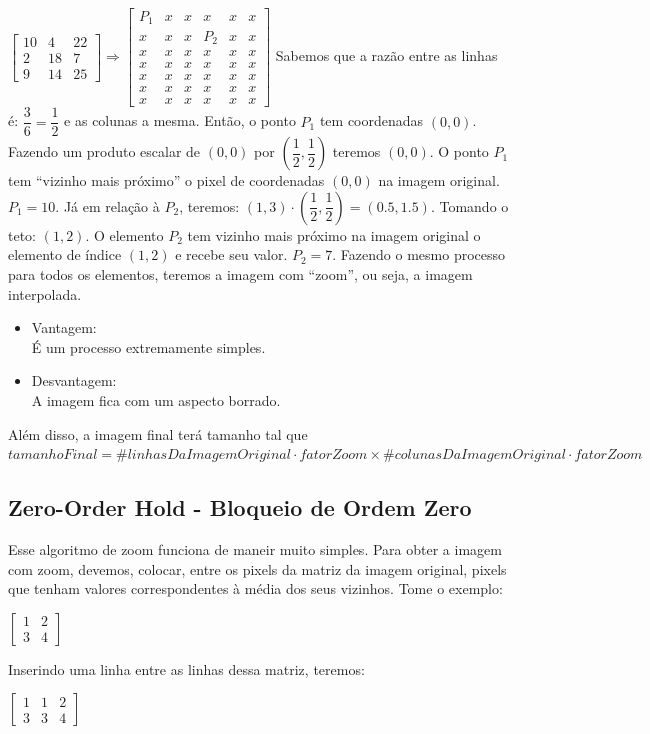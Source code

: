 \documentclass[a4paper, 12pt]{article}
\begin{document}
$
\begin{bmatrix}
	10 & 4 & 22 \\
	2 & 18 & 7 \\
	9 & 14 & 25
\end{bmatrix}
\Rightarrow 
\begin{bmatrix}
	P_1 &  x &  x & x & x  & x \\
     x   &  x & x &  P_2 & x & x \\
	 x	& x & x &  x  &  x  & x  \\
	 x	& x & x &  x  &  x  & x \\
	 x	& x &  x  &  x  & x & x \\
	 x	& x & x &  x  &  x  & x \\
	 x	& x & x & x  & x  & x 

\end{bmatrix}$
Sabemos que a razão entre as linhas é: $\dfrac{3}{6} = \dfrac{1}{2}$ e as colunas a mesma. Então, o ponto $P_1$ tem coordenadas $(0, 0)$. 
Fazendo um produto escalar de $(0, 0)$ por $\left(\dfrac{1}{2}, \dfrac{1}{2}\right)$ teremos $(0, 0)$. O ponto $P_1$ tem ``vizinho mais próximo'' o pixel 
de coordenadas $(0, 0)$ na imagem original. $P_1 = 10$. Já em relação à $P_2$, teremos: $(1, 3) \cdot \left(\dfrac{1}{2}, \dfrac{1}{2}\right) = \left(0.5, 1.5\right)$. 
Tomando o teto: $(1, 2)$. O elemento $P_2$ tem vizinho mais próximo na imagem original o elemento de índice $(1, 2)$ e recebe seu valor. 
$P_2 = 7$. Fazendo o mesmo processo para todos os elementos, teremos a imagem com ``zoom'', ou seja, a imagem interpolada.
\begin{itemize}
\item Vantagem:
\\
É um processo extremamente simples.
\item Desvantagem:
\\
A imagem fica com um aspecto borrado.
\end{itemize}
Além disso, a imagem final terá tamanho tal que 
\\
$tamanhoFinal = \#linhasDaImagemOriginal \cdot fatorZoom \times \#colunasDaImagemOriginal \cdot fatorZoom$
\subsection{Zero-Order Hold - Bloqueio de Ordem Zero}
Esse algoritmo de zoom funciona de maneir muito simples. Para obter a imagem com zoom, devemos, colocar, entre os pixels da matriz da imagem original, 
pixels que tenham valores correspondentes à média dos seus vizinhos. Tome o exemplo:
\begin{center}
$
\begin{bmatrix}
1 & 2 \\
3 & 4
\end{bmatrix}
$
\end{center}
Inserindo uma linha entre as linhas dessa matriz, teremos:
\begin{table}
\centering
$
\begin{bmatrix}
1 & 1 & 2 \\
3 & 3 & 4
\end{bmatrix}
$
\end{table}
\end{document}

